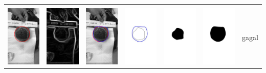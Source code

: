 \begin{table}[H]
\begin{tabular}{|m{0.7in}|m{0.7in}|m{0.7in}|m{0.7in}|m{0.7in}|m{0.7in}|m{0.7in}|}
		&  &  & & & &  \\
		\includegraphics[width=0.7in]{dataset/dataset_3/luka_merah/ready/9_interp_init.jpg}&
		\includegraphics[width=0.7in]{dataset/dataset_3/luka_merah/ready/9_interp_ext.jpg}&
		\includegraphics[width=0.7in]{dataset/dataset_3/luka_merah/ready/9_interp_result.jpg}&
		\includegraphics[width=0.7in]{dataset/dataset_3/luka_merah/ready/9_gt_r.jpg}&
		\includegraphics[width=0.7in]{dataset/dataset_3/luka_merah/ready/9_r.jpg}&
		\includegraphics[width=0.7in]{dataset/dataset_3/luka_merah/ready/9_interp_r.jpg}&
		gagal\\
		\hline
		

\end{tabular}
\end{table}
